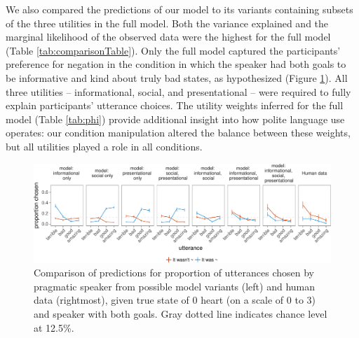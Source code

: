 \documentclass[12pt]{article}
\begin{document}
We also compared the predictions of our model to its variants containing subsets of the three utilities in the full model. Both the variance explained and the marginal likelihood of the observed data were the highest for the full model (Table \ref{tab:comparisonTable}).
Only the full model captured the participants' preference for negation in the condition in which the speaker had both goals to be informative and kind about truly bad states, as hypothesized (Figure \ref{fig:comparison}). All three utilities -- informational, social, and presentational -- were required to fully explain participants' utterance choices.
The utility weights inferred for the full model (Table  \ref{tab:phi}) provide additional insight into how polite language use operates: our condition manipulation altered the balance between these weights, but all utilities played a role in all conditions.


\begin{figure}
\centering
\includegraphics[width=\textwidth]{polite_manuscript_files/figure-latex/comparison-1.pdf}
\caption{\label{fig:comparison}Comparison of predictions for proportion of
utterances chosen by pragmatic speaker from possible model variants
(left) and human data (rightmost), given true state of 0 heart (on a scale
of 0 to 3) and speaker with both goals. Gray dotted line indicates
chance level at 12.5\%.}
\end{figure}
\end{document}
